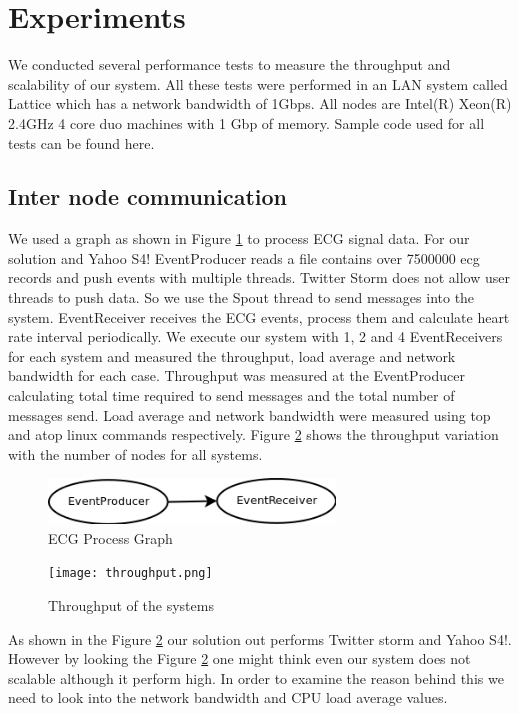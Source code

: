 \section{Experiments}

We conducted several performance tests to measure the throughput and scalability of our system. All these tests were performed in an LAN system called Lattice which has a network bandwidth of 1Gbps. All nodes are Intel(R) Xeon(R) 2.4GHz 4 core duo machines with 1 Gbp of memory. Sample code used for all tests can be found here\cite{solutionCode}.


\subsection{Inter node communication}
We used a graph as shown in Figure \ref{ecgGraph} to process ECG signal data. For our solution and Yahoo S4! EventProducer reads a file contains over 7500000 ecg records and push events with multiple threads. Twitter Storm does not allow user threads to push data. So we use the Spout thread to send messages into the system. EventReceiver  receives the ECG events, process them and calculate heart rate interval periodically.  
We execute our system with 1, 2 and 4  EventReceivers for each system and measured the throughput, load average and network bandwidth  for each case. Throughput was measured at the EventProducer calculating total time required to send messages and the total number of messages send. Load average and network bandwidth were measured using top and atop linux commands respectively. Figure \ref{throuput} shows the throughput variation with the number of nodes for all systems. 

\begin{figure}[!t]
        \centering
        \includegraphics[width=3.0in]{ecgGraph.png}
        \caption{ECG Process Graph}
        \label{ecgGraph}
\end{figure}
\begin{figure}[!t]
        \centering
        \texttt{[image: throughput.png]}
        \caption{Throughput of the systems}
        \label{throuput}
\end{figure}

As shown in the Figure \ref{throuput} our solution out performs Twitter storm and Yahoo S4!. However by looking the Figure \ref{throuput} one might think even our system does not scalable although it perform high. In order to examine the reason behind this we need to look into the network bandwidth and CPU load average values. 
 

